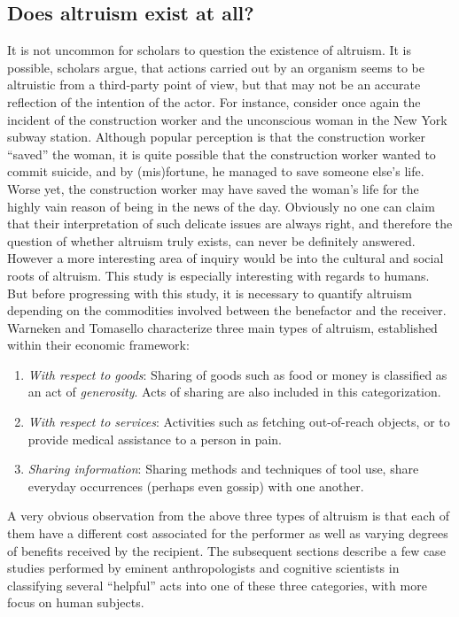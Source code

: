 \documentclass[12pt, letter]{article}
\begin{document}
\subsection*{Does altruism exist at all?} 
It is not uncommon for scholars to question the existence of altruism. It is possible, scholars argue, that actions carried out by an organism seems to be altruistic from a third-party point of view, but that may not be an accurate reflection of the intention of the actor. For instance, consider once again the incident of the construction worker and the unconscious woman in the New York subway station. Although popular perception is that the construction worker ``saved'' the woman, it is quite possible that the construction worker wanted to commit suicide, and by (mis)fortune, he managed to save someone else's life. Worse yet, the construction worker may have saved the woman's life for the highly vain reason of being in the news of the day. Obviously no one can claim that their interpretation of such delicate issues are always right, and therefore the question of whether altruism truly exists, can never be definitely answered. However a more interesting area of inquiry would be into the cultural and social roots of altruism. This study is especially interesting with regards to humans. But before progressing with this study, it is necessary to quantify altruism depending on the commodities involved between the benefactor and the receiver. Warneken and Tomasello \cite{tomasello2008origins} characterize three main types of altruism, established within their economic framework:
\begin{enumerate}
\item \textit{With respect to goods}: Sharing of goods such as food or money is classified as an act of \textit{generosity}. Acts of sharing are also included in this categorization.
\item \textit{With respect to services}: Activities such as fetching out-of-reach objects, or to provide medical assistance to a person in pain.
\item \textit{Sharing information}: Sharing methods and techniques of tool use, share everyday occurrences (perhaps even gossip) with one another.
\end{enumerate}
A very obvious observation from the above three types of altruism is that each of them have a different cost associated for the performer as well as varying degrees of benefits received by the recipient. The subsequent sections describe a few case studies performed by eminent anthropologists and cognitive scientists in classifying several ``helpful'' acts into one of these three categories, with more focus on human subjects.
\end{document}
